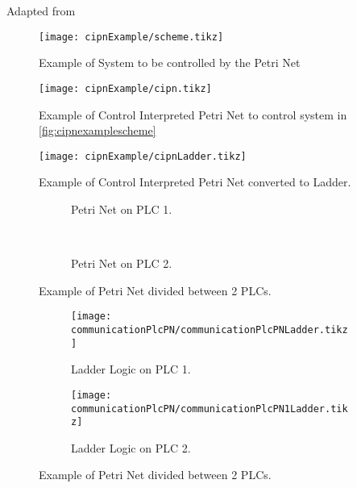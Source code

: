 Adapted from \cite{david1989grafcet}
\begin{figure}[H]
  \centering
  \texttt{[image: cipnExample/scheme.tikz]}
  \caption[cipnexample]{Example of System to be controlled by the Petri Net}
  \label{fig:cipnexamplescheme}
\end{figure}

\pagebreak
\begin{figure}[H]
  \centering
  \texttt{[image: cipnExample/cipn.tikz]}
  \caption[cipnexample]{Example of Control Interpreted Petri Net to control
    system in \autoref{fig:cipnexamplescheme}}
  \label{fig:cipnexample}
\end{figure}



\usetikzlibrary{arrows,shapes,circuits.plc.ladder,external}

\begin{figure}[H]
  \centering
  \texttt{[image: cipnExample/cipnLadder.tikz]}
  \caption[cipnexample]{Example of Control Interpreted Petri Net converted to Ladder.}
  \label{fig:cipnexampleLadder}
\end{figure}

\begin{figure}[H]
    \centering
    \begin{subfigure}[t]{0.5\textwidth}
      \centering
        \caption{Petri Net on PLC 1.}
        \label{fig:communicationPlcPN}
    \end{subfigure}%
    ~ 
    \begin{subfigure}[t]{0.5\textwidth}
        \centering
  \caption{Petri Net on PLC 2.}
  \label{fig:communicationPlcPN1}
    \end{subfigure}
    \caption{Example of Petri Net divided between 2 PLCs.}
\end{figure}


\begin{figure}[H]
    \centering
    \begin{subfigure}[t]{0.45\textwidth}
        \centering
        \texttt{[image: communicationPlcPN/communicationPlcPNLadder.tikz]}
        \caption{Ladder Logic on PLC 1.}
        \label{fig:communicationPlcPN}
    \end{subfigure}%
\hfill
    \begin{subfigure}[t]{0.45\textwidth}
        \centering
        \texttt{[image: communicationPlcPN/communicationPlcPN1Ladder.tikz]}
  \caption{Ladder Logic on PLC 2.}
  \label{fig:communicationPlcPN1}
    \end{subfigure}
    \caption{Example of Petri Net divided between 2 PLCs.}
\end{figure}
  

